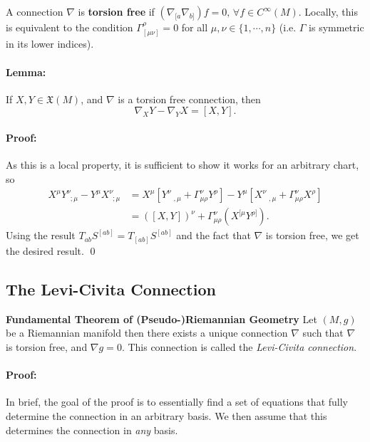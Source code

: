 \documentclass[11pt,fleqn]{report}
\begin{document}
\begin{definition}
A connection $\nabla$ is \textbf{torsion free} if $(\nabla_{[a}\nabla_{b]})f=0, \, \forall f \in C^\infty(M)$.
Locally, this is equivalent to the condition $\Gamma^\rho_{[\mu\nu]} = 0$ for all $\mu,\nu\in\{1,\cdots,n\}$ (i.e. $\Gamma$ is symmetric in its lower indices).
\end{definition}

\paragraph{Lemma:} If $X,Y \in \mathfrak{X}(M)$, and $\nabla$ is a torsion free connection, then
\begin{equation}
	\nabla_XY-\nabla_YX=\left[X,Y\right].
\end{equation}

\paragraph{Proof:} As this is a local property, it is sufficient to show it works for an arbitrary chart, so
	\begin{align}
		X^\mu Y^\nu_{\phantom v ; \mu} - Y^\mu X^\nu_{\phantom v ; \mu} &= X^\mu\left[Y^\nu_{\phantom m ,\mu}
		 + \Gamma^\nu_{\mu\rho}Y^\rho\right] - Y^\mu\left[X^\nu_{\phantom m ,\mu}
		 + \Gamma^\nu_{\mu\rho}X^\rho\right] \\
		 &= \left(\left[X,Y\right]\right)^\nu +\Gamma^\nu_{\mu\rho}\left(X^{[\mu}Y^{\rho]}\right).
	\end{align}
Using the result $T_{ab}S^{[ab]}=T_{[ab]}S^{[ab]}$ and the fact that $\nabla$ is torsion free, we get the desired result. \qed

\subsection{The Levi-Civita Connection}

\begin{theorem}
	\textbf{Fundamental Theorem of (Pseudo-)Riemannian Geometry}
	Let $(M,g)$ be a Riemannian manifold then there exists a unique connection $\nabla$ such that $\nabla$ is torsion free, and $\nabla g =0$. This connection is called the \textit{Levi-Civita connection}.
\end{theorem}

\paragraph{Proof:} In brief, the goal of the proof is to essentially find a set of equations that fully determine the connection in an arbitrary basis. We then assume that this determines the connection in \textit{any} basis.
\end{document}

